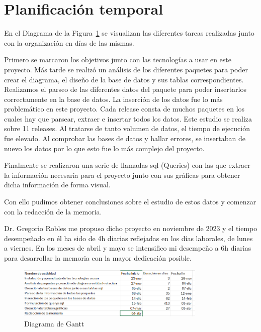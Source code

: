 \documentclass[a4paper, 12pt]{book}
\begin{document}
\section{Planificación temporal}
\label{sec:planificacion-temporal}

En el Diagrama de la Figura~\ref{fig:diagrama_gantt} se visualizan las diferentes tareas realizadas junto con la organización en días de las mismas. 

Primero se marcaron los objetivos junto con las tecnologías a usar en este proyecto.
Más tarde se realizó un análisis de los diferentes paquetes para poder crear el diagrama, el diseño de la base de datos y sus tablas correspondientes.
Realizamos el parseo de las diferentes datos del paquete para poder insertarlos correctamente en la base de datos.
La inserción de los datos fue lo más problemático en este proyecto. Cada release consta de muchos paquetes en los cuales hay que parsear, extraer e insertar todos los datos. Este estudio se realiza sobre 11 releases. Al tratarse de tanto volumen de datos, el tiempo de ejecución fue elevado. Al comprobar las bases de datos y hallar errores, se insertaban de nuevo los datos por lo que esto fue lo más complejo del proyecto.

Finalmente se realizaron una serie de llamadas sql (Queries) con las que extraer la información necesaria para el proyecto junto con sus gráficas para obtener dicha información de forma visual.

Con ello pudimos obtener conclusiones sobre el estudio de estos datos y comenzar con la redacción de la memoria.

Dr. Gregorio Robles me propuso dicho proyecto en noviembre de 2023 y el tiempo desempeñado en él ha sido de 4h diarias reflejadas en los días laborales, de lunes a viernes. En los meses de abril y mayo se intensifico mi desempeño a 6h diarias para desarrollar la memoria con la mayor dedicación posible.

\begin{figure}
	\centering
	\includegraphics[width=9cm, keepaspectratio]{img/Gantt.png}
	\caption{Diagrama de Gantt}
	\label{fig:diagrama_gantt}
\end{figure}

\end{document}
